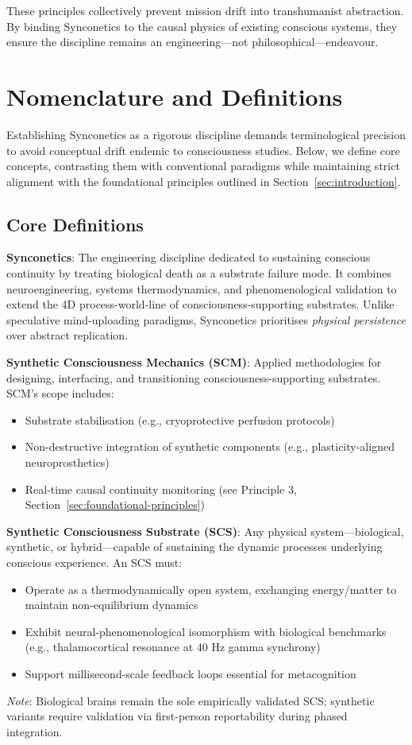 \documentclass[10pt]{article}
\begin{document}
\begin{sloppypar}
  These principles collectively prevent mission drift into transhumanist abstraction. By binding Synconetics to the causal physics of existing conscious systems, they ensure the discipline remains an engineering—not philosophical—endeavour.

  \section{Nomenclature and Definitions}
  \label{sec:nomenclature}

  Establishing Synconetics as a rigorous discipline demands terminological precision to avoid conceptual drift endemic to consciousness studies. Below, we define core concepts, contrasting them with conventional paradigms while maintaining strict alignment with the foundational principles outlined in Section~\ref{sec:introduction}.

  \subsection{Core Definitions}
  \textbf{Synconetics}: The engineering discipline dedicated to sustaining conscious continuity by treating biological death as a substrate failure mode. It combines neuroengineering, systems thermodynamics, and phenomenological validation to extend the 4D process-world-line of consciousness-supporting substrates. Unlike speculative mind-uploading paradigms, Synconetics prioritises \textit{physical persistence} over abstract replication.

  \textbf{Synthetic Consciousness Mechanics (SCM)}: Applied methodologies for designing, interfacing, and transitioning consciousness-supporting substrates. SCM’s scope includes:
  \begin{itemize}
    \item Substrate stabilisation (e.g., cryoprotective perfusion protocols)
    \item Non-destructive integration of synthetic components (e.g., plasticity-aligned neuroprosthetics)
    \item Real-time causal continuity monitoring (see Principle 3, Section~\ref{sec:foundational-principles})
  \end{itemize}

  \textbf{Synthetic Consciousness Substrate (SCS)}: Any physical system—biological, synthetic, or hybrid—capable of sustaining the dynamic processes underlying conscious experience. An SCS must:
  \begin{itemize}
    \item Operate as a thermodynamically open system, exchanging energy/matter to maintain non-equilibrium dynamics
    \item Exhibit neural-phenomenological isomorphism with biological benchmarks (e.g., thalamocortical resonance at 40 Hz gamma synchrony)
    \item Support millisecond-scale feedback loops essential for metacognition
  \end{itemize}
  \textit{Note}: Biological brains remain the sole empirically validated SCS; synthetic variants require validation via first-person reportability during phased integration.


\end{sloppypar}
\end{document}
